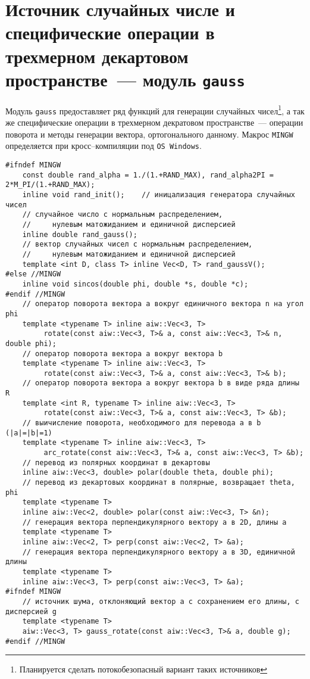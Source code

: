 \def\rotop{\circlearrowleft}
\def\vctr3#1#2#3{\left(\begin{matrix}{#1}\\{#2}\\{#3}\end{matrix}\right)}
\def\mstyle{\scriptstyle}
\def\dmdt#1{{\dfdx{^{#1}\m}{t^{#1}}}}
\def\dfdx#1#2{\frac{\partial #1}{\partial #2}}

\section{Источник случайных числе и специфические операции в трехмерном декартовом пространстве~--- модуль {\tt gauss}}\label{gauss:sec}
Модуль \verb'gauss' предоставляет ряд функций для генерации случайных чисел\footnote{Планируется сделать потокобезопасный вариант таких источников},
а так же специфические операции в трехмерном декратовом пространстве~---
операции поворота и методы генерации вектора, ортогонального данному. Макрос \verb'MINGW' определяется при кросс--компиляции под \verb'OS Windows'.
\begin{verbatim}
#ifndef MINGW
    const double rand_alpha = 1./(1.+RAND_MAX), rand_alpha2PI = 2*M_PI/(1.+RAND_MAX);
    inline void rand_init();    // иницализация генератора случайных чисел
    // случайное число с нормальным распределением, 
    //     нулевым матожиданием и единичной дисперсией
    inline double rand_gauss(); 
    // вектор случайных чисел с нормальным распределением,
    //     нулевым матожиданием и единичной дисперсией
    template <int D, class T> inline Vec<D, T> rand_gaussV(); 
#else //MINGW
    inline void sincos(double phi, double *s, double *c);
#endif //MINGW
    // оператор поворота вектора a вокруг единичного вектора n на угол phi 
    template <typename T> inline aiw::Vec<3, T> 
         rotate(const aiw::Vec<3, T>& a, const aiw::Vec<3, T>& n, double phi);
    // оператор поворота вектора a вокруг вектора b
    template <typename T> inline aiw::Vec<3, T> 
         rotate(const aiw::Vec<3, T>& a, const aiw::Vec<3, T>& b);
    // оператор поворота вектора a вокруг вектора b в виде ряда длины R
    template <int R, typename T> inline aiw::Vec<3, T> 
         rotate(const aiw::Vec<3, T>& a, const aiw::Vec<3, T> &b);
    // выичисление поворота, необходимого для перевода a в b (|a|=|b|=1)
    template <typename T> inline aiw::Vec<3, T> 
         arc_rotate(const aiw::Vec<3, T>& a, const aiw::Vec<3, T> &b);
    // перевод из полярных координат в декартовы
	inline aiw::Vec<3, double> polar(double theta, double phi);
    // перевод из декартовых координат в полярные, возвращает theta, phi
    template <typename T> 
    inline aiw::Vec<2, double> polar(const aiw::Vec<3, T> &n);
    // генерация вектора перпендикулярного вектору a в 2D, длины a
    template <typename T> 
    inline aiw::Vec<2, T> perp(const aiw::Vec<2, T> &a);
    // генерация вектора перпендикулярного вектору a в 3D, единичной длины 
    template <typename T> 
    inline aiw::Vec<3, T> perp(const aiw::Vec<3, T> &a);
#ifndef MINGW
    // источник шума, отклоняющий вектор a с сохранением его длины, с дисперсией g
    template <typename T> 
    aiw::Vec<3, T> gauss_rotate(const aiw::Vec<3, T>& a, double g);
#endif //MINGW
\end{verbatim}
